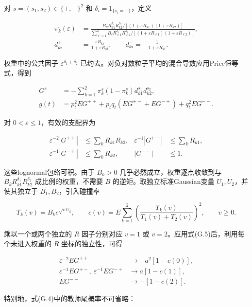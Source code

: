 \documentclass[11pt,a4paper]{article}
\begin{document}
对 \(s=(s_1,s_2)\in\{+,-\}^2\) 和 \(\delta_i=1_{\{s_i=-\}}\)，定义

\[
\begin{aligned}
\pi_k^s(\varepsilon)&=
\frac{B_kR_{k1}^{\delta_1}R_{k2}^{\delta_2}/[(1+\varepsilon R_{k1})(1+\varepsilon R_{k2})]}
{\sum_{\ell=1}^2B_\ell R_{\ell1}^{\delta_1}R_{\ell2}^{\delta_2}/[(1+\varepsilon R_{\ell1})(1+\varepsilon R_{\ell2})]},\\
d_{ki}^+&=\frac{\varepsilon R_{ki}}{1+\varepsilon R_{ki}},\qquad
 d_{ki}^-=-\frac1{1+\varepsilon R_{ki}}.
\end{aligned}
\tag{G.3}
\]

权重中的公共因子 \(\varepsilon^{\delta_1+\delta_2}\)
已约去。对负对数粒子平均的混合导数应用Price恒等式\citep{price1958}，得到

\[
\begin{aligned}
G^s&=-\sum_{k=1}^2\pi_k^s(1-\pi_k^s)d_{k1}^{s_1}d_{k2}^{s_2},\\
g(t)&=p_t^2EG^{++}+p_tq_t(EG^{+-}+EG^{-+})+q_t^2EG^{--}.
\end{aligned}
\tag{G.4}
\]

对 \(0<\varepsilon\le1\)，有效的支配界为

\[
\begin{aligned}
\varepsilon^{-2}|G^{++}|&\le\sum_kR_{k1}R_{k2},&
\varepsilon^{-1}|G^{+-}|&\le\sum_kR_{k1},\\
\varepsilon^{-1}|G^{-+}|&\le\sum_kR_{k2},&
|G^{--}|&\le1.
\end{aligned}
\tag{G.5}
\]

这些lognormal包络可积。由于 \(B_k>0\) 几乎必然成立，权重逐点收敛到与
\(B_kR_{k1}^{\delta_1}R_{k2}^{\delta_2}\) 成比例的权重，不需要 \(B\)
的逆矩。取独立标准Gaussian变量 \(U_1,U_2\)，并使其独立于
\(B_1,B_2\)，引入碰撞率

\[
T_k(v)=B_ke^{\sqrt vU_k},\qquad
c(v)=E\sum_{k=1}^2\left(\frac{T_k(v)}{T_1(v)+T_2(v)}\right)^2,
\qquad v\ge0.
\tag{G.6}
\]

乘以一个或两个独立的 \(R\) 因子分别对应 \(v=1\) 或
\(v=2\)。应用式(G.5)后，利用每个未进入权重的 \(R\) 坐标的独立性，可得

\[
\begin{aligned}
\varepsilon^{-2}EG^{++}&\longrightarrow-a^2[1-c(0)],\\
\varepsilon^{-1}EG^{+-},\ \varepsilon^{-1}EG^{-+}
&\longrightarrow a[1-c(1)],\\
EG^{--}&\longrightarrow-[1-c(2)].
\end{aligned}
\tag{G.7}
\]

特别地，式(G.4)中的教师尾概率不可省略：
\end{document}
